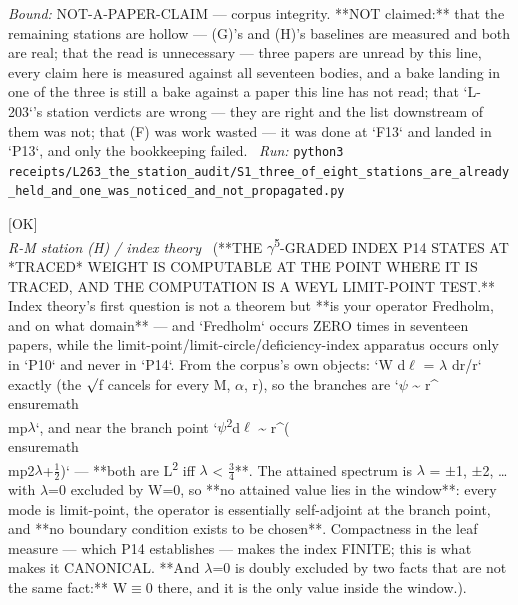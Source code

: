 \begin{description}
 \emph{Bound:} NOT-A-PAPER-CLAIM --- corpus integrity. **NOT claimed:** that the remaining stations are hollow --- (G)'s and (H)'s baselines are measured and both are real; that the read is unnecessary --- three papers are unread by this line, every claim here is measured against all seventeen bodies, and a bake landing in one of the three is still a bake against a paper this line has not read; that `L-203`'s station verdicts are wrong --- they are right and the list downstream of them was not; that (F) was work wasted --- it was done at `F13` and landed in `P13`, and only the bookkeeping failed.
\ \emph{Run:} \texttt{python3 receipts/L263\_the\_station\_audit/S1\_three\_of\_eight\_stations\_are\_already\_held\_and\_one\_was\_noticed\_and\_not\_propagated.py}
\item[\label{rcpt:K1_the_traced_index_is_computable_and_the_computation_is_a_limit_point_test}\texttt{K1\_the\_traced\_index\_is\_computable\_and\_the\_computation\_is\_a\_limit\_point\_test}]\hfill\textsf{[OK]}\\
\textit{R-M station (H) / index theory} \ (**THE \ensuremath{\gamma}\textsuperscript{5}-GRADED INDEX P14 STATES AT *TRACED* WEIGHT IS COMPUTABLE AT THE POINT WHERE IT IS TRACED, AND THE COMPUTATION IS A WEYL LIMIT-POINT TEST.** Index theory's first question is not a theorem but **is your operator Fredholm, and on what domain** --- and `Fredholm` occurs ZERO times in seventeen papers, while the limit-point/limit-circle/deficiency-index apparatus occurs only in `P10` and never in `P14`. From the corpus's own objects: `W d\ensuremath{\ell} = \ensuremath{\lambda} dr/r` exactly (the \ensuremath{\surd}f cancels for every M, \ensuremath{\alpha}, r), so the branches are `\ensuremath{\psi} \textasciitilde{} r\textasciicircum{}\\ensuremath{\\mp}\ensuremath{\lambda}`, and near the branch point `\textbar{}\ensuremath{\psi}\textbar{}\textsuperscript{2}d\ensuremath{\ell} \textasciitilde{} r\textasciicircum{}(\\ensuremath{\\mp}2\ensuremath{\lambda}+\ensuremath{\tfrac12})` --- **both are L\textsuperscript{2} iff \textbar{}\ensuremath{\lambda}\textbar{} < \ensuremath{\tfrac34}**. The attained spectrum is \ensuremath{\lambda} = \ensuremath{\pm}1, \ensuremath{\pm}2, \ldots{} with \ensuremath{\lambda}=0 excluded by W=0, so **no attained value lies in the window**: every mode is limit-point, the operator is essentially self-adjoint at the branch point, and **no boundary condition exists to be chosen**. Compactness in the leaf measure --- which P14 establishes --- makes the index FINITE; this is what makes it CANONICAL. **And \ensuremath{\lambda}=0 is doubly excluded by two facts that are not the same fact:** W\ensuremath{\equiv}0 there, and it is the only value inside the window.). 

\end{description}
